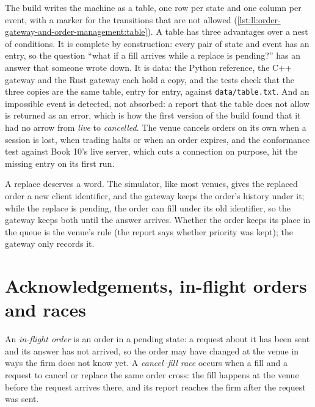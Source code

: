 The build writes the machine as a table, one row per state and one column per event, with a marker for the transitions that
are not allowed (\cref{lst:ll:order-gateway-and-order-management:table}). A table has three advantages over a nest of
conditions. It is complete by construction: every pair of state and event has an entry, so the question ``what if a fill
arrives while a replace is pending?'' has an answer that someone wrote down. It is data: the Python reference, the C++ gateway
and the Rust gateway each hold a copy, and the tests check that the three copies are the same table, entry for entry,
against \texttt{data/table.txt}. And an impossible event is detected, not absorbed: a report that the table does not allow
is returned as an error, which is how the first version of the build found that it had no arrow from \emph{live} to
\emph{cancelled}. The venue cancels orders on its own when a session is lost, when trading halts or when an order expires, and
the conformance test against Book 10's live server, which cuts a connection on purpose, hit the missing entry on its first run.

\label{lst:ll:order-gateway-and-order-management:table}

A replace deserves a word. The simulator, like most venues, gives the replaced order a new client identifier, and the gateway
keeps the order's history under it; while the replace is pending, the order can fill under its old identifier, so the gateway
keeps both until the answer arrives. Whether the order keeps its place in the queue is the venue's rule (the report says
whether priority was kept); the gateway only records it.

\section{Acknowledgements, in-flight orders and races}

\begin{definition}\label{def:ll:order-gateway-and-order-management:inflight}
An \emph{in-flight order} is an order in a pending state: a request about it has been sent and its
answer has not arrived, so the order may have changed at the venue in ways the firm does not know yet. A \emph{cancel--fill
race} occurs when a fill and a request to cancel or replace the same order cross: the fill happens at
the venue before the request arrives there, and its report reaches the firm after the request was sent.
\end{definition}

